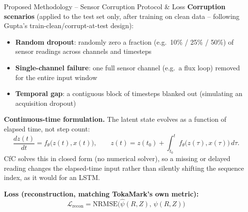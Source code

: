 \documentclass[aspectratio=169]{beamer}
\begin{document}
\begin{frame}{Proposed Methodology -- Sensor Corruption Protocol \& Loss}
  \small
  \textbf{Corruption scenarios} (applied to the test set only, after
  training on clean data -- following Gupta's train-clean/corrupt-at-test
  design):
  \begin{itemize}
    \setlength\itemsep{2pt}
    \item \textbf{Random dropout}: randomly zero a fraction (e.g.\ 10\% /
      25\% / 50\%) of sensor readings across channels and timesteps
    \item \textbf{Single-channel failure}: one full sensor channel (e.g.\ a
      flux loop) removed for the entire input window
    \item \textbf{Temporal gap}: a contiguous block of timesteps blanked
      out (simulating an acquisition dropout)
  \end{itemize}

  \vspace{4pt}
  \textbf{Continuous-time formulation.} The latent state evolves as a
  function of elapsed time, not step count:
  \[
    \frac{dz(t)}{dt} = f_\theta\big(z(t), x(t)\big), \qquad
    z(t) = z(t_0) + \int_{t_0}^{t} f_\theta\big(z(\tau), x(\tau)\big)\, d\tau .
  \]
  CfC solves this in closed form (no numerical solver), so a missing or
  delayed reading changes the elapsed-time input rather than silently
  shifting the sequence index, as it would for an LSTM.

  \vspace{4pt}
  \textbf{Loss (reconstruction, matching TokaMark's own metric):}
  \[
    \mathcal{L}_{\text{recon}} = \text{NRMSE}\big(\hat{\psi}(R,Z),\, \psi(R,Z)\big)
  \]
\end{frame}

\end{document}
